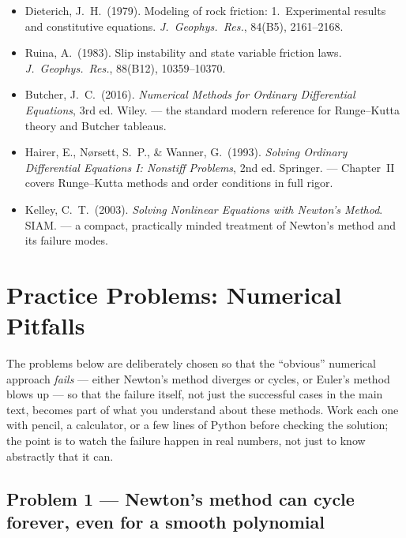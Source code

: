 \begin{itemize}
\item Dieterich, J.\ H.\ (1979). Modeling of rock friction: 1.\ Experimental results and constitutive equations. \emph{J.\ Geophys.\ Res.}, 84(B5), 2161--2168.
\item Ruina, A.\ (1983). Slip instability and state variable friction laws. \emph{J.\ Geophys.\ Res.}, 88(B12), 10359--10370.
\item Butcher, J.\ C.\ (2016). \emph{Numerical Methods for Ordinary Differential Equations}, 3rd ed. Wiley. --- the standard modern reference for Runge--Kutta theory and Butcher tableaus.
\item Hairer, E., N{\o}rsett, S.\ P., \& Wanner, G.\ (1993). \emph{Solving Ordinary Differential Equations I: Nonstiff Problems}, 2nd ed. Springer. --- Chapter~II covers Runge--Kutta methods and order conditions in full rigor.
\item Kelley, C.\ T.\ (2003). \emph{Solving Nonlinear Equations with Newton's Method}. SIAM. --- a compact, practically minded treatment of Newton's method and its failure modes.
\end{itemize}

\section{Practice Problems: Numerical Pitfalls}

The problems below are deliberately chosen so that the ``obvious'' numerical
approach \emph{fails} --- either Newton's method diverges or cycles, or
Euler's method blows up --- so that the failure itself, not just the
successful cases in the main text, becomes part of what you understand
about these methods. Work each one with pencil, a calculator, or a few
lines of Python before checking the solution; the point is to watch the
failure happen in real numbers, not just to know abstractly that it can.

\newcommand{\pitfall}[1]{\par\smallskip\noindent\textbf{Pitfall to notice:} #1\par\smallskip}
\newcommand{\solution}{\par\smallskip\noindent\textbf{Solution.}\ }

\subsection*{Problem 1 --- Newton's method can cycle forever, even for a smooth polynomial}

